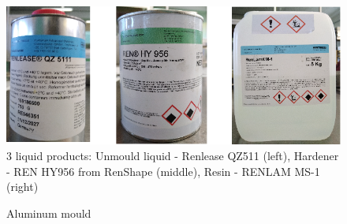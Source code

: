 \begin{figure}[!tb]
    \centering
    \includegraphics[width=0.9\linewidth]{./figures/spectral-brdf-measurements/3-materials.png}
    \caption{3 liquid products: Unmould liquid - Renlease QZ511 (left), Hardener - REN HY956 from RenShape (middle), Resin - RENLAM MS-1 (right)}
    \label{fig:3-materials}
\end{figure}


\begin{figure}[!tb]
    \centering
    \hfil
    \caption{Aluminum mould}
    \label{fig:module}
\end{figure}


